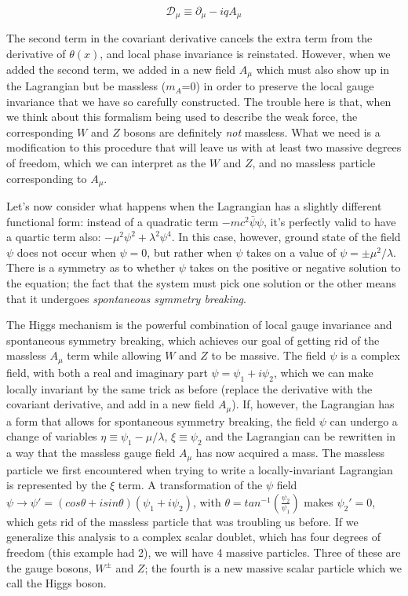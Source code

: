 \begin{equation}
\mathscr{D}_\mu \equiv \partial_\mu - iqA_\mu
\end{equation}

The second term in the covariant derivative cancels the extra term from the derivative of 
$\theta(x)$, and local phase invariance is reinstated.  However, when 
we added the second term, we added in a new field $A_\mu$ 
which must also show up in the Lagrangian but be massless ($m_A$=0) 
in order to preserve the local gauge invariance that we have so carefully constructed.  
The trouble here is that, when we think about this formalism being used to 
describe the weak force, the corresponding $W$ and $Z$ bosons 
are definitely \textit{not} massless.  What we need is a modification 
to this procedure that will leave us with at least two massive degrees of freedom, 
which we can interpret as the $W$ and $Z$, and no massless particle corresponding to $A_\mu$.

Let's now consider what happens when the Lagrangian has a slightly different functional 
form: instead of a quadratic term $-mc^2\bar{\psi}\psi$, 
it's perfectly valid to have a quartic term also: $-\mu^2\psi^2+\lambda^2 \psi^4$.  
In this case, however, ground state of the field $\psi$ does 
not occur when $\psi=0$, but rather when $\psi$ takes 
on a value of $\psi = \pm \mu^2/\lambda$.  
There is a symmetry as to whether $\psi$ takes on the positive or 
negative solution to the equation; the fact that the system must pick one solution 
or the other means that it undergoes \textit{spontaneous symmetry breaking}.

The Higgs mechanism is the powerful combination of local gauge invariance and spontaneous symmetry 
breaking, which achieves our goal of getting rid of the massless $A_\mu$ 
term while allowing $W$ and $Z$ to be massive.  The 
field $\psi$ is a complex field, with both a real and imaginary 
part $\psi=\psi_1+i\psi_2$, which we can make locally invariant 
by the same trick as before (replace the derivative with the covariant derivative, 
and add in a new field $A_\mu$).  If, however, 
the Lagrangian has a form that allows for spontaneous symmetry breaking, the field 
$\psi$ can undergo a change of variables $\eta\equiv \psi_1 - \mu/\lambda$, 
$\xi\equiv \psi_2$ and the Lagrangian can be rewritten 
in a way that the massless gauge field $A_\mu$ has now 
acquired a mass.  The massless particle we first encountered when trying to write a 
locally-invariant Lagrangian is represented by the $\xi$ term.  A transformation 
of the $\psi$ field $\psi \rightarrow \psi' = (cos\theta + i sin\theta)(\psi_1+i\psi_2)$, 
with $\theta=tan^{-1}(\frac{\psi_2}{\psi_1})$ 
makes $\psi_2'=0$, which gets rid of the massless particle 
that was troubling us before.  If we generalize this analysis to a  complex scalar 
doublet, which has four degrees of freedom (this example had 2), we 
will have 4 massive particles.  Three of these are the gauge bosons, 
$W^\pm$ and $Z$; the fourth is a new massive scalar particle which we call the Higgs boson.



